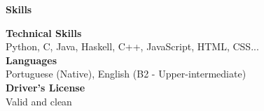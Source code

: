 \noindent\textbf{Skills}
\noindent\hrulefill
\vspace{0.25em}
\begin{adjustwidth}{1.5em}{0em}
\textbf{Technical Skills}\\
Python, C, Java, Haskell, C++, JavaScript, HTML, CSS...
\vspace{0.5em}
\\
\textbf{Languages}\\
Portuguese (Native), English (B2 - Upper-intermediate)
\vspace{0.5em}
\\
\textbf{Driver’s License}\\
Valid and clean
\end{adjustwidth}
\vspace{0.25em}